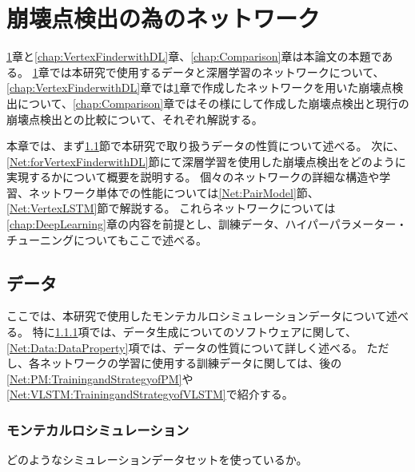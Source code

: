 
\chapter{崩壊点検出の為のネットワーク} \label{chap:Networks}

\ref{chap:Networks}章と\ref{chap:VertexFinderwithDL}章、\ref{chap:Comparison}章は本論文の本題である。
\ref{chap:Networks}章では本研究で使用するデータと深層学習のネットワークについて、\ref{chap:VertexFinderwithDL}章では\ref{chap:Networks}章で作成したネットワークを用いた崩壊点検出について、\ref{chap:Comparison}章ではその様にして作成した崩壊点検出と現行の崩壊点検出との比較について、それぞれ解説する。

本章では、まず\ref{Net:Data}節で本研究で取り扱うデータの性質について述べる。
次に、\ref{Net:forVertexFinderwithDL}節にて深層学習を使用した崩壊点検出をどのように実現するかについて概要を説明する。
個々のネットワークの詳細な構造や学習、ネットワーク単体での性能については\ref{Net:PairModel}節、\ref{Net:VertexLSTM}節で解説する。
これらネットワークについては\ref{chap:DeepLearning}章の内容を前提とし、訓練データ、ハイパーパラメーター・チューニングについてもここで述べる。

\section{データ} \label{Net:Data}

ここでは、本研究で使用したモンテカルロシミュレーションデータについて述べる。
特に\ref{Net:Data: MonteCarloSimulation}項では、データ生成についてのソフトウェアに関して、\ref{Net:Data:DataProperty}項では、データの性質について詳しく述べる。
ただし、各ネットワークの学習に使用する訓練データに関しては、後の\ref{Net:PM:TrainingandStrategyofPM}や\ref{Net:VLSTM:TrainingandStrategyofVLSTM}で紹介する。

\subsection{モンテカルロシミュレーション} \label{Net:Data: MonteCarloSimulation}

どのようなシミュレーションデータセットを使っているか。\\

